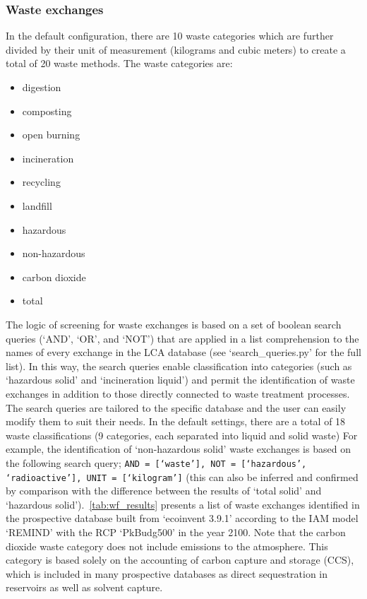 \subsubsection{Waste exchanges}\label{sec:method-T-reX-waste_exchanges}

In the default configuration, there are 10 waste categories which are further divided by their unit of measurement (kilograms and cubic meters) to create a total of 20 waste methods. The waste categories are:
\begin{itemize}[itemsep=0pt]
    \item digestion
    \item composting
    \item open burning
    \item incineration
    \item recycling
    \item landfill
    \item hazardous
    \item non-hazardous
    \item carbon dioxide 
    \item total
\end{itemize}

The logic of screening for waste exchanges is based on a set of boolean search queries (`AND', `OR', and `NOT') that are applied in a list comprehension to the names of every exchange in the LCA database (see `search\_queries.py' for the full list). In this way, the search queries enable classification into categories (such as `hazardous solid' and `incineration liquid') and permit the identification of waste exchanges in addition to those directly connected to waste treatment processes. The search queries are tailored to the specific database and the user can easily modify them to suit their needs. In the default settings, there are a total of 18 waste classifications (9 categories, each separated into liquid and solid waste) For example, the identification of `non-hazardous solid' waste exchanges is based on the following search query; \texttt{AND = [`waste'], NOT = [`hazardous', `radioactive'], UNIT = [`kilogram']} (this can also be inferred and confirmed by comparison with the difference between the results of `total solid' and `hazardous solid').\ \autoref{tab:wf_results} presents a list of waste exchanges identified in the prospective database built from `ecoinvent 3.9.1' according to the IAM model `REMIND' with the RCP `PkBudg500' in the year 2100. Note that the carbon dioxide waste category does not include emissions to the atmosphere. This category is based solely on the accounting of carbon capture and storage (CCS), which is included in many prospective databases as direct sequestration in reservoirs as well as solvent capture.

